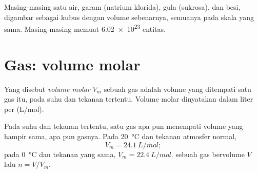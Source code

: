 \begin{omfigure}

{\small Masing-masing satu  air, garam (natrium klorida), gula
(sukrosa), dan besi, digambar sebagai kubus dengan volume sebenarnya,
semuanya pada skala yang sama. Masing-masing memuat \num{6.02e23}
entitas.}
\end{omfigure}

\section{Gas: volume molar}

\begin{definition}\label{def:g10:the-mole:molar-volume}
Yang disebut \emph{volume molar} $V_m$ sebuah gas
adalah volume yang ditempati satu  gas itu, pada suhu dan tekanan
tertentu. Volume molar dinyatakan dalam liter per  (\si{L/mol}).
\end{definition}

\begin{proposition}\label{prop:g10:the-mole:avogadro-law}
Pada suhu dan tekanan tertentu, satu  gas apa pun menempati volume
yang hampir sama, apa pun gasnya. Pada \qty{20}{\celsius} dan tekanan
atmosfer normal,
\[
  V_m = \qty{24.1}{L/mol};
\]
pada \qty{0}{\celsius} dan tekanan yang sama, $V_m = \qty{22.4}{L/mol}$.
 sebuah gas bervolume $V$ lalu $n = V / V_m$.
\end{proposition}

